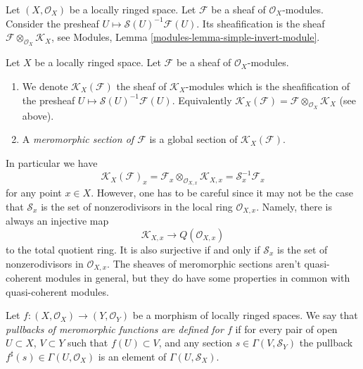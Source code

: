 \noindent
Let $(X, \mathcal{O}_X)$ be a locally ringed space.
Let $\mathcal{F}$ be a sheaf of $\mathcal{O}_X$-modules.
Consider the presheaf $U \mapsto \mathcal{S}(U)^{-1}\mathcal{F}(U)$.
Its sheafification is the sheaf
$\mathcal{F} \otimes_{\mathcal{O}_X} \mathcal{K}_X$, see
Modules, Lemma \ref{modules-lemma-simple-invert-module}.

\begin{definition}
\label{definition-meromorphic-section}
Let $X$ be a locally ringed space.
Let $\mathcal{F}$ be a sheaf of $\mathcal{O}_X$-modules.
\begin{enumerate}
\item We denote
$\mathcal{K}_X(\mathcal{F})$
the sheaf of $\mathcal{K}_X$-modules which is
the sheafification of the presheaf
$U \mapsto \mathcal{S}(U)^{-1}\mathcal{F}(U)$. Equivalently
$\mathcal{K}_X(\mathcal{F}) =
\mathcal{F} \otimes_{\mathcal{O}_X} \mathcal{K}_X$ (see above).
\item A {\it meromorphic section of $\mathcal{F}$}
is a global section of $\mathcal{K}_X(\mathcal{F})$.
\end{enumerate}
\end{definition}

\noindent
In particular we have
$$
\mathcal{K}_X(\mathcal{F})_x
=
\mathcal{F}_x \otimes_{\mathcal{O}_{X, x}} \mathcal{K}_{X, x}
=
\mathcal{S}_x^{-1}\mathcal{F}_x
$$
for any point $x \in X$. However, one has to be careful since it may
not be the case that $\mathcal{S}_x$ is the set of nonzerodivisors
in the local ring $\mathcal{O}_{X, x}$. Namely, there is always
an injective map
$$
\mathcal{K}_{X, x} \longrightarrow Q(\mathcal{O}_{X, x})
$$
to the total quotient ring. It is also surjective if and only if
$\mathcal{S}_x$ is the set of nonzerodivisors in $\mathcal{O}_{X, x}$.
The sheaves of meromorphic sections aren't quasi-coherent
modules in general, but they do have some properties in common
with quasi-coherent modules.

\begin{definition}
\label{definition-pullback-meromorphic-sections}
Let $f : (X, \mathcal{O}_X) \to (Y, \mathcal{O}_Y)$ be a morphism
of locally ringed spaces. We say that {\it pullbacks of meromorphic
functions are defined for $f$} if for every pair of open
$U \subset X$, $V \subset Y$ such that $f(U) \subset V$, and any
section $s \in \Gamma(V, \mathcal{S}_Y)$ the pullback
$f^\sharp(s) \in \Gamma(U, \mathcal{O}_X)$ is an element
of $\Gamma(U, \mathcal{S}_X)$.
\end{definition}

